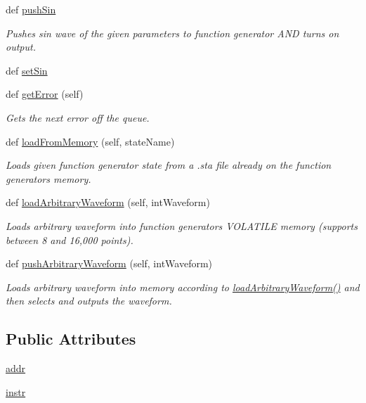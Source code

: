 \begin{DoxyCompactItemize}
def \hyperlink{class_function_generator_1_1_function_generator_a35c5bc4df66d86595b825e13aba94c1a}{push\+Sin}
\begin{DoxyCompactList}\small\item\em Pushes sin wave of the given parameters to function generator A\+N\+D turns on output. \end{DoxyCompactList}\item 
def \hyperlink{class_function_generator_1_1_function_generator_a2f5cd14920dd4119f21ec9dca71481c4}{set\+Sin}
\item 
def \hyperlink{class_function_generator_1_1_function_generator_a93a5580a96697fa28f311dd7bdb1c63f}{get\+Error} (self)
\begin{DoxyCompactList}\small\item\em Gets the next error off the queue. \end{DoxyCompactList}\item 
def \hyperlink{class_function_generator_1_1_function_generator_a600d8bcdc6ee83dfdff2a55e6f1c14ba}{load\+From\+Memory} (self, state\+Name)
\begin{DoxyCompactList}\small\item\em Loads given function generator state from a .sta file already on the function generator\textquotesingle{}s memory. \end{DoxyCompactList}\item 
def \hyperlink{class_function_generator_1_1_function_generator_a2e963bfd957e16f574f4e06bbdc0bf7e}{load\+Arbitrary\+Waveform} (self, int\+Waveform)
\begin{DoxyCompactList}\small\item\em Loads arbitrary waveform into function generator\textquotesingle{}s V\+O\+L\+A\+T\+I\+L\+E memory (supports between 8 and 16,000 points). \end{DoxyCompactList}\item 
def \hyperlink{class_function_generator_1_1_function_generator_a11d42f7cad0d19efd1fcf879d05f03fc}{push\+Arbitrary\+Waveform} (self, int\+Waveform)
\begin{DoxyCompactList}\small\item\em Loads arbitrary waveform into memory according to \hyperlink{class_function_generator_1_1_function_generator_a2e963bfd957e16f574f4e06bbdc0bf7e}{load\+Arbitrary\+Waveform()} and then selects and outputs the waveform. \end{DoxyCompactList}\end{DoxyCompactItemize}
\subsection*{Public Attributes}
\begin{DoxyCompactItemize}
\item 
\hyperlink{class_function_generator_1_1_function_generator_a6232661c93750461489cadd41b721d56}{addr}
\item 
\hyperlink{class_function_generator_1_1_function_generator_a31f74674e20ebd808c28abf817cafccf}{instr}
\end{DoxyCompactItemize}
